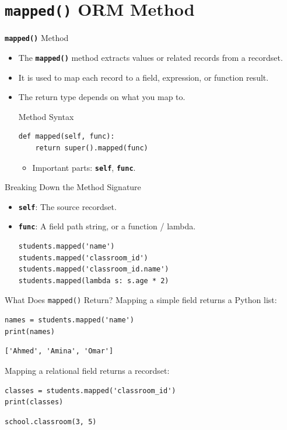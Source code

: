 
\section{\textbf{\texttt{mapped()}} ORM Method}

\begin{frame}[fragile]{\textbf{\texttt{mapped()}} Method}
	\begin{itemize}
		\item The \textbf{\texttt{mapped()}} method extracts values or related records from a recordset.
		\item It is used to map each record to a field, expression, or function result.
		\item The return type depends on what you map to.
\begin{block}{Method Syntax}
\begin{lstlisting}
def mapped(self, func):
	return super().mapped(func)
\end{lstlisting}
	\begin{itemize}
		\item Important parts: \textbf{\texttt{self}}, \textbf{\texttt{func}}.
	\end{itemize}
\end{block}
	\end{itemize}
\end{frame}

\begin{frame}[fragile]{Breaking Down the Method Signature}
	\begin{block}{}
		\begin{itemize}
			\item \textbf{\texttt{self}}: The source recordset.
			\item \textbf{\texttt{func}}: A field path string, or a function / lambda.
\begin{lstlisting}
students.mapped('name')
students.mapped('classroom_id')
students.mapped('classroom_id.name')
students.mapped(lambda s: s.age * 2)
\end{lstlisting}
		\end{itemize}
	\end{block}
\end{frame}

\begin{frame}[fragile]{What Does \texttt{mapped()} Return?}
	Mapping a simple field returns a Python list:
\begin{lstlisting}
names = students.mapped('name')
print(names)
\end{lstlisting}
\begin{lstlisting}
['Ahmed', 'Amina', 'Omar']
\end{lstlisting}
	Mapping a relational field returns a recordset:
\begin{lstlisting}
classes = students.mapped('classroom_id')
print(classes)
\end{lstlisting}
\begin{lstlisting}
school.classroom(3, 5)
\end{lstlisting}
\end{frame}

